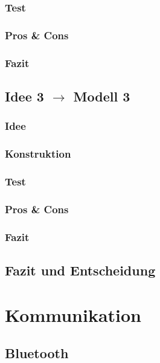 \documentclass[10pt,a4paper]{scrartcl}
\begin{document}
\subsubsection{Test}
\subsubsection{Pros \& Cons}
\subsubsection{Fazit}
\subsection{Idee 3 $\rightarrow$ Modell 3}%
\subsubsection{Idee}
\subsubsection{Konstruktion}
\subsubsection{Test}
\subsubsection{Pros \& Cons}
\subsubsection{Fazit}
\subsection{Fazit und Entscheidung}
\section{Kommunikation}
\subsection{Bluetooth}
\end{document}
